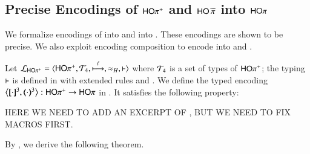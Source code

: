 \subsection{Precise Encodings of $\mathsf{HO\pi^{+}}$ and $\mathsf{HO}\,{\widetilde{\pi}}$ into $\mathsf{HO}\pi$}
\noi We formalize  %
encodings of \HOpp into \HOp
and into \PHOp. These encodings are shown to be precise. 
We also exploit encoding composition to encode
\PHOpp into \HO and \sessp.
 

%

Let
	$\mathcal{L}_{\mathsf{HO\pi^{+}}}=\langle \mathsf{HO\pi^{+}}, {\cal{T}}_4, \stackrel{\ell}{\longmapsto}, \approx_H, \vdash \rangle$
where 
	${\cal{T}}_4$ is a set of types of $\mathsf{HO\pi^{+}}$;  
the typing $\vdash$ is defined in 
 with extended rules  and . 
We define 
the typed encoding
$\enco{\map{\cdot}^{3}, \mapt{\cdot}^{3}}: \HOpp \to \HOp$
in .
It satisfies the following property:

HERE WE NEED TO ADD AN EXCERPT OF , BUT WE NEED TO FIX MACROS FIRST.


By , 
we derive the following theorem. 

